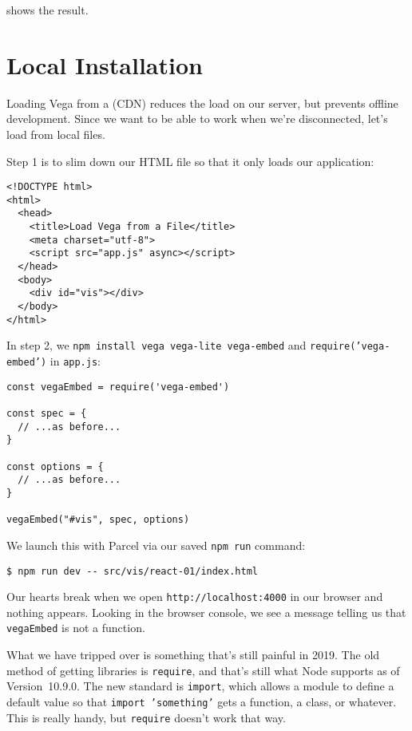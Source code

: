  shows the result.


\section{Local Installation}\label{s:vis-vega-local}

Loading Vega from a  (CDN) reduces the load on our server,
but prevents offline development.
Since we want to be able to work when we're disconnected,
let's load from local files.

Step 1 is to slim down our HTML file so that it only loads our application:

\begin{verbatim}
<!DOCTYPE html>
<html>
  <head>
    <title>Load Vega from a File</title>
    <meta charset="utf-8">
    <script src="app.js" async></script>
  </head>
  <body>
    <div id="vis"></div>
  </body>
</html>
\end{verbatim}

\noindent
In step 2,
we \texttt{npm\ install\ vega\ vega-lite\ vega-embed} and \texttt{require('vega-embed')} in \texttt{app.js}:

\begin{verbatim}
const vegaEmbed = require('vega-embed')

const spec = {
  // ...as before...
}

const options = {
  // ...as before...
}

vegaEmbed("#vis", spec, options)
\end{verbatim}

\noindent
We launch this with Parcel via our saved \texttt{npm\ run} command:

\begin{verbatim}
$ npm run dev -- src/vis/react-01/index.html
\end{verbatim}

Our hearts break when we open \texttt{http://localhost:4000} in our browser and nothing appears.
Looking in the browser console,
we see a message telling us that \texttt{vegaEmbed} is not a function.

What we have tripped over is something that's still painful in 2019.
The old method of getting libraries is \texttt{require},
and that's still what Node supports as of Version~10.9.0.
The new standard is \texttt{import},
which allows a module to define a default value so that \texttt{import\ 'something'} gets a function, a class, or whatever.
This is really handy, but \texttt{require} doesn't work that way.

